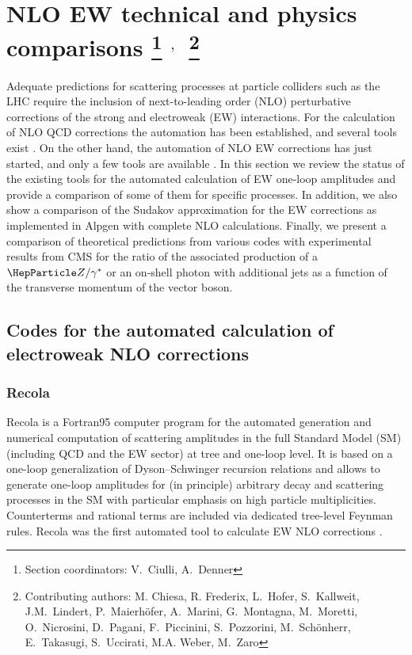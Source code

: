 \documentclass[11pt]{cernrep}
\begin{document}
\section{NLO EW technical and physics comparisons%
\protect\footnote{Section
    coordinators: V.~Ciulli, A.~Denner} 
$^{,}$~\protect\footnote{Contributing authors: 
M. Chiesa, 
R. Frederix,  
L.~Hofer,
S.~Kallweit,
J.M.~Lindert,
P.~Maierh\"ofer,
A.~Marini, 
G.~Montagna, 
M.~Moretti, 
O.~Nicrosini, 
D.~Pagani,
F.~Piccinini,
S.~Pozzorini,
M.~Sch\"onherr, 
E.~Takasugi,
S.~Uccirati, 
M.A. Weber,
M.~Zaro}}


Adequate predictions for scattering processes at particle colliders
such as the LHC require the inclusion of next-to-leading order (NLO)
perturbative corrections of the strong and electroweak (EW) interactions.
For the calculation of NLO QCD corrections the automation has been
established, and several tools exist
\cite{Hahn:1998yk,Arnold:2008rz,Berger:2008sj,Becker:2010ng,
  Badger:2010nx,Hirschi:2011pa,Bevilacqua:2011xh,Cullen:2011ac,Cascioli:2011va}.
On the other hand, the automation of NLO EW corrections has just
started, and only a few tools are available
\cite{Actis:2012qn,Kallweit:2014xda,Frixione:2014qaa,Chiesa:2015mya}.
In this section we review the status of the existing tools for the
automated calculation of EW one-loop amplitudes and provide a
comparison of some of them for specific processes. In addition,
we also show a comparison of the Sudakov approximation for the EW
corrections as implemented in {\sc Alpgen} \cite{Mangano:2002ea}
with complete NLO calculations. 
%
Finally, we present a comparison of theoretical predictions from
various codes with experimental results from CMS for the ratio of the
associated production of a $\PZ/\gamma^*$ or an on-shell photon with
additional jets as a function of the transverse momentum of the
vector boson.
 

\subsection{Codes for the automated calculation of electroweak NLO corrections}

\subsubsection*{\sc Recola}

{\sc Recola} is a Fortran95 computer program for the automated
generation and numerical computation of scattering amplitudes in the
full Standard Model (SM) (including QCD and the EW sector) at tree
and one-loop level. It is based on a one-loop generalization of
Dyson--Schwinger recursion relations \cite{vanHameren:2009vq} and
allows to generate one-loop amplitudes for (in principle) arbitrary
decay and scattering processes in the SM with 
particular emphasis on high particle multiplicities. Counterterms
\cite{Denner:1991kt} and rational terms \cite{Garzelli:2009is} are
included via dedicated tree-level Feynman rules. {\sc Recola} was the
first automated tool to calculate EW NLO corrections
\cite{Actis:2012qn}.
\end{document}
